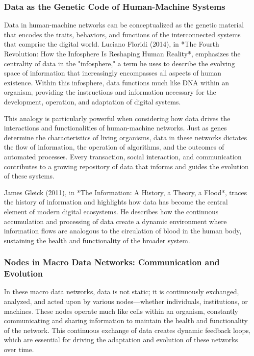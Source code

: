 \documentclass[12pt,twoside]{article}
\begin{document}
\subsubsection{Data as the Genetic Code of Human-Machine Systems}

Data in human-machine networks can be conceptualized as the genetic material that encodes the traits, behaviors, and functions of the interconnected systems that comprise the digital world. Luciano Floridi (2014), in *The Fourth Revolution: How the Infosphere Is Reshaping Human Reality*, emphasizes the centrality of data in the "infosphere," a term he uses to describe the evolving space of information that increasingly encompasses all aspects of human existence. Within this infosphere, data functions much like DNA within an organism, providing the instructions and information necessary for the development, operation, and adaptation of digital systems.

This analogy is particularly powerful when considering how data drives the interactions and functionalities of human-machine networks. Just as genes determine the characteristics of living organisms, data in these networks dictates the flow of information, the operation of algorithms, and the outcomes of automated processes. Every transaction, social interaction, and communication contributes to a growing repository of data that informs and guides the evolution of these systems.

James Gleick (2011), in *The Information: A History, a Theory, a Flood*, traces the history of information and highlights how data has become the central element of modern digital ecosystems. He describes how the continuous accumulation and processing of data create a dynamic environment where information flows are analogous to the circulation of blood in the human body, sustaining the health and functionality of the broader system.

\subsubsection{Nodes in Macro Data Networks: Communication and Evolution}

In these macro data networks, data is not static; it is continuously exchanged, analyzed, and acted upon by various nodes—whether individuals, institutions, or machines. These nodes operate much like cells within an organism, constantly communicating and sharing information to maintain the health and functionality of the network. This continuous exchange of data creates dynamic feedback loops, which are essential for driving the adaptation and evolution of these networks over time.
\end{document}

